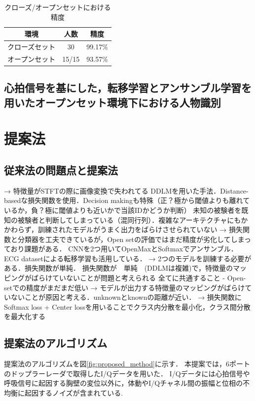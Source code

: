 \begin{table}[H]
\caption{クローズ/オープンセットにおける精度}
\centering
\begin{tabular}{ccc}
\hline
環境 & 人数 & 精度 \\
\hline
クローズセット & 30 & 99.17\% \\
オープンセット & 15/15 & 93.57\% \\
\hline
\end{tabular}
\label{table:HeartSignature}
\end{table}

\section{心拍信号を基にした，転移学習とアンサンブル学習を用いたオープンセット環境下における人物識別\cite{paper:Xing}}

\chapter{提案法}
\section{従来法の問題点と提案法}
→ 特徴量がSTFTの際に画像変換で失われてる
DDLMを用いた手法．Distance-basedな損失関数を使用．Decision makingも特殊（正？極から閾値よりも離れているか，負？極に閾値よりも近いかで当該IDかどうか判断）
未知の被験者を既知の被験者と判断してしまっている（混同行列）．複雑なアーキテクチャにもかかわらず，訓練されたモデルがうまく出力をばらけさせられていない
→ 損失関数と分類器を工夫できているが，Open setの評価ではまだ精度が劣化してしまっており課題がある．
CNNを2つ用いてOpenMaxとSoftmaxでアンサンブル．ECG datasetによる転移学習も活用している．
→ 2つのモデルを訓練する必要がある．損失関数が単純．
損失関数が~~単純~~(DDLMは複雑)で，特徴量のマッピングがばらけていないことが問題と考えられる
全てに共通すること
- Open-setでの精度がまだまだ低い
→ モデルが出力する特徴量のマッピングがばらけていないことが原因と考える．unknownとknownの距離が近い．
→ 損失関数にSoftmax loss + Center lossを用いることでクラス内分散を最小化，クラス間分散を最大化する

\section{提案法のアルゴリズム}
提案法のアルゴリズムを図\ref{fig:proposed_method}に示す．
本提案では，6ポートのドップラーレーダで取得したI/Qデータを用いた．
I/Qデータには心拍信号や呼吸信号に起因する胸壁の変位以外に，体動やI/Qチャネル間の振幅と位相の不均衡に起因するノイズが含まれている.

